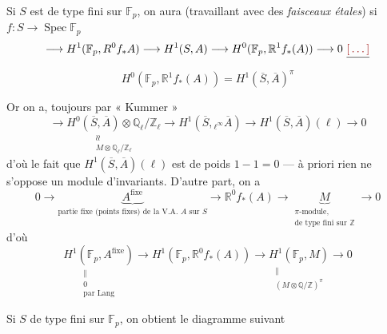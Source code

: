 \documentclass[11pt,a4paper]{article}
\begin{document}
Si $S$ est de type fini sur $\mathbb{F}_{p}$, on aura (travaillant avec des
\emph{faisceaux étales}) si $f : S \to \operatorname{Spec} \mathbb{F}_{p}$
\[
  \longrightarrow H^{1}(\mathbb{F}_{p}, R^{0}f_{*}A) \longrightarrow H^{1}(S, A) \longrightarrow H^{0}(\mathbb{F}_{p}, \mathbb{R}^{1}f_{*}(A)) \longrightarrow 0 \ \struck{\ill{}}
\]
\[
  H^{0}(\mathbb{F}_{p}, \mathbb{R}^{1}f_{*}(A)) = H^{1}(\overline{S}, \overline{A})^{\pi}
\]

Or on a, toujours par « Kummer »
\[
  \longrightarrow \underset{\substack{\wr\wr \\ M \otimes \mathbb{Q}_{\ell}/\mathbb{Z}_{\ell}}}{H^{0}(\overline{S}, \overline{A}) \otimes \mathbb{Q}_{\ell}/\mathbb{Z}_{\ell}} \longrightarrow H^{1}(\overline{S}, {}_{\ell^{\infty}}\overline{A}) \longrightarrow H^{1}(\overline{S}, \overline{A})(\ell) \longrightarrow 0
\]
d'où le fait que $H^{1}(\overline{S}, \overline{A})(\ell)$ est de poids
$1 - 1 = 0$  --- à
priori rien ne s'oppose  un 
module d'invariants. D'autre part, on a
\[
  0 \longrightarrow \underbrace{A^{\mathrm{fixe}}}_{\text{partie fixe (points fixes) de la V.A. } A \text{ sur } S} \longrightarrow \mathbb{R}^{0}f_{*}(A) \longrightarrow \underbrace{M}_{\substack{\pi\text{-module,} \\ \text{de type fini sur } \mathbb{Z}}} \longrightarrow 0
\]
d'où
\[
  \underset{\substack{\| \\ 0 \\ \text{par Lang}}}{H^{1}(\mathbb{F}_{p}, A^{\mathrm{fixe}})} \longrightarrow H^{1}(\mathbb{F}_{p}, \mathbb{R}^{0}f_{*}(A)) \longrightarrow \underset{\substack{\| \\ (M \otimes \mathbb{Q}/\mathbb{Z})^{\pi}}}{H^{1}(\mathbb{F}_{p}, M)} \longrightarrow 0
\]

Si $S$ de type fini sur $\mathbb{F}_{p}$, on obtient le diagramme suivant

\end{document}

